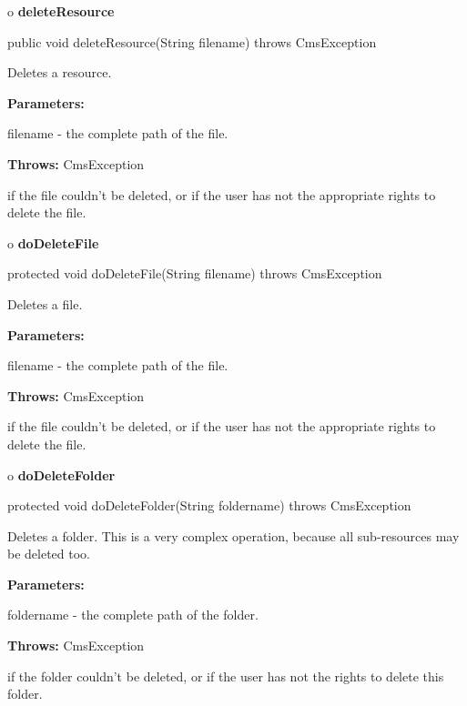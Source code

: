 o {\bf deleteResource} 

\begin{PRE}
 public void deleteResource(String filename) throws CmsException
\end{PRE}

\begin{description}
\htmlDD Deletes a resource. 

\begin{description}
\item {\bf Parameters:}  

filename - the complete path of the file.  
\item {\bf Throws:} CmsException  

if the file couldn't be deleted, or if the user has not the appropriate rights
to delete the file.  
\end{description}

\end{description}

o {\bf doDeleteFile} 

\begin{PRE}
 protected void doDeleteFile(String filename) throws CmsException
\end{PRE}

\begin{description}
\htmlDD Deletes a file. 

\begin{description}
\item {\bf Parameters:}  

filename - the complete path of the file.  
\item {\bf Throws:} CmsException  

if the file couldn't be deleted, or if the user has not the appropriate rights
to delete the file.  
\end{description}

\end{description}

o {\bf doDeleteFolder} 

\begin{PRE}
 protected void doDeleteFolder(String foldername) throws CmsException
\end{PRE}

\begin{description}
\htmlDD Deletes a folder. \htmlBR
This is a very complex operation, because all sub-resources may be deleted
too. 

\begin{description}
\item {\bf Parameters:}  

foldername - the complete path of the folder.  
\item {\bf Throws:} CmsException  

if the folder couldn't be deleted, or if the user has not the rights to delete
this folder.  
\end{description}

\end{description}

